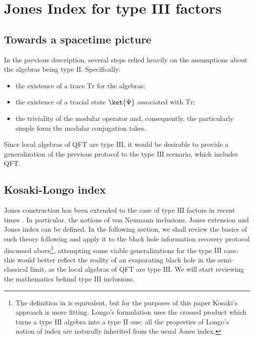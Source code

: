 \documentclass[a4paper,11pt]{article}
\begin{document}
\section{Jones Index for type III factors}
\subsection{Towards a spacetime picture}

In the previous description, several steps relied heavily on the assumptions about the algebras being type $\mathrm{II}$. Specifically:

\begin{itemize}
    \item the existence of a trace $\mathrm{Tr}$ for the algebras;
    \item the existence of a tracial state $\ket{\Psi}$ associated with $\mathrm{Tr}$;
    \item the triviality of the modular operator and, consequently, the particularly simple form the modular conjugation takes. 
\end{itemize}
%
Since local algebras of QFT are type $\mathrm{III}$, it would be desirable to provide a generalization of the previous protocol to the type $\mathrm{III}$ scenario, which includes QFT.

\subsection{Kosaki-Longo index}

Jones construction has been extended to the case of type $\mathrm{III}$ factors in recent times \cite{Kosaki} \cite{Kosaki1} \cite{Longo} \cite{Longo1}. In particular, the notions of von Neumann inclusions, Jones extension and Jones index can be defined. In the following section, we shall review the basics of such theory following \cite{Kosaki} and apply it to the black hole information recovery protocol discussed above\footnote{The definition in \cite{Longo} is equivalent, but for the purposes of this paper Kosaki's approach is more fitting. Longo's formulation uses the crossed product which turns a type $\mathrm{III}$ algebra into a type $\mathrm{II}$ one; all the properties of Longo's notion of index are naturally inherited from the usual Jones index.}, attempting some viable generalizations for the type $\mathrm{III}$ case: this would better reflect the reality of an evaporating black hole in the semi-classical limit, as the local algebras of QFT are type $\mathrm{III}$. We will start reviewing the mathematics behind type $\mathrm{III}$ inclusions.
\end{document}
